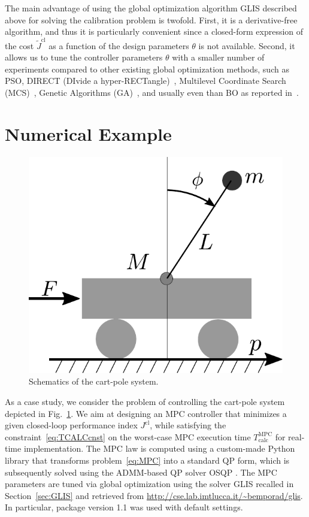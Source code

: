 \documentclass{article}
\newcommand{\TCALCMPC}{T_{\mathrm{calc}}^{\mathrm{MPC}}}
\newcommand{\JC}{{J^\mathrm{cl}}}
\newcommand{\JCt}{{\tilde{J}^\mathrm{cl}}}
\begin{document}
The main advantage of using the global optimization algorithm GLIS described above  for  solving  the calibration problem  is twofold. First, it is a derivative-free  algorithm, and thus it is particularly convenient since  a closed-form expression of the cost $\JCt$ as a function of the design parameters $\theta$ is not available. Second, it allows us to tune the controller parameters $\theta$ with a smaller number of experiments compared to other existing global optimization methods,
such as PSO, DIRECT (DIvide a hyper-RECTangle)~\citep{Jon09},
Multilevel Coordinate Search (MCS)~\citep{HN99}, Genetic Algorithms (GA)~\citep{Han06},
and usually even than BO as reported in~\citep{bemporad2019global}.



\section{Numerical Example}
\label{sec:example}
\begin{figure}
	\centering
	\includegraphics[width=.4\textwidth]{fig/cart_pole.pdf} 
	\caption{Schematics of the cart-pole system.}
	\label{fig:pendulum_cart}  
\end{figure}

As a case study, we consider the problem of controlling the cart-pole system depicted in Fig.~\ref{fig:pendulum_cart}.  
We aim at designing an MPC controller that minimizes a given closed-loop performance index $\JC$, while satisfying the constraint~\eqref{eq:TCALCcnst} on the worst-case MPC execution time $\TCALCMPC$ for real-time implementation.
The MPC law is computed using a custom-made Python library that transforms problem~\eqref{eq:MPC} into a standard QP form, which is subsequently solved using the ADMM-based QP solver OSQP \citep{stellato2018osqp}. 
The MPC parameters are tuned via global optimization using the solver GLIS
recalled in Section~\ref{sec:GLIS} and retrieved from \url{http://cse.lab.imtlucca.it/~bemporad/glis}. In particular, package version 1.1  was used with default settings.
\end{document}
